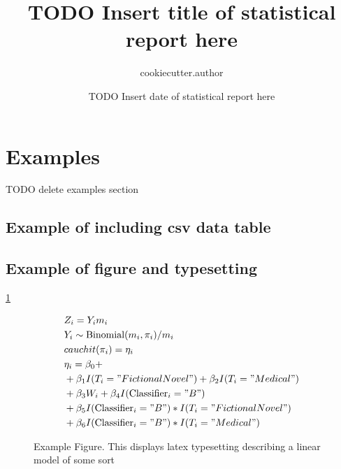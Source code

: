 \documentclass{article}
\title{TODO Insert title of statistical report here}
\author{
    {{ cookiecutter.author }}
}
\date{TODO Insert date of statistical report here}
\begin{document}
\maketitle
\section{Examples} %
    TODO delete examples section
    \subsection{Example of including csv data table} %
    \subsection{Example of figure and typesetting} %
        \ref{fig:type_interaction_model}
        \begin{figure}
            \begin{align*}
                &Z_i = Y_i m_i\\
                &Y_i \sim \text{Binomial}(m_i, \pi_i)/m_i\\
                &cauchit(\pi_i) = \eta_i\\
                &\eta_i = \beta_0 +\\
                &+\beta_1 I(T_i="Fictional Novel")
                +\beta_2 I(T_i="Medical")\\
                &+\beta_3 W_i
                +\beta_4 I(\text{Classifier}_i="B")\\
                &+\beta_5 I(\text{Classifier}_i="B") * I(T_i="Fictional Novel")\\
                &+\beta_6 I(\text{Classifier}_i="B") * I(T_i="Medical")
            \end{align*}
            \caption{Example Figure. This displays latex typesetting describing a linear model of some sort}
            \label{fig:type_interaction_model}
        \end{figure}
\end{document}
